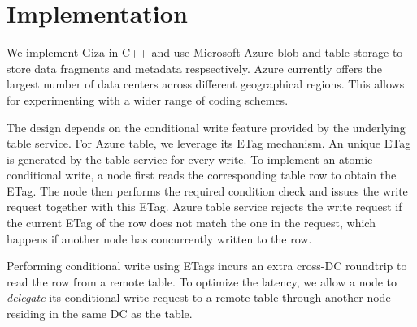 \section{Implementation}
\label{sec:impl}

We implement Giza in C++ and use Microsoft Azure blob and table storage to store data fragments and metadata respsectively.
Azure currently offers the largest number of data centers across different geographical regions. This allows for experimenting 
with a wider range of coding schemes.


The \name design depends on the conditional write feature provided by the underlying 
table service.
For Azure table, we leverage its ETag mechanism. An unique ETag 
is generated by the table service for every write.  To implement an atomic
conditional write, a \name node first reads the corresponding table row to
obtain the ETag. The node then performs the required condition check and issues the
write request together with this ETag.  Azure table service rejects the
write request if the current ETag of the row does not match the one in the
request, which happens if another \name node has concurrently written to the row.  

Performing conditional write using ETags 
incurs an extra cross-DC roundtrip to read the row from a remote table.
To optimize the latency, we allow a \name node to \emph{delegate} its 
conditional write request to a remote table through another node 
residing in the same DC as the table.


